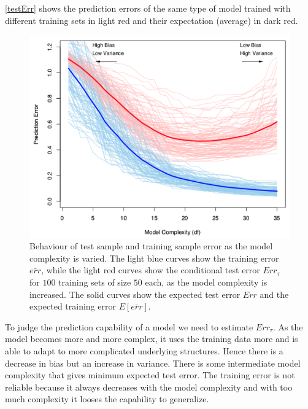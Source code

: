 \documentclass[12pt, letterpaper]{article}
\theoremstyle{definition}
\begin{document}
\autoref{testErr} shows the prediction errors of the same type of model trained with different training sets in light red and their expectation (average) in dark red.

\begin{figure}
\includegraphics[scale=0.6]{img/testErr}
\caption{Behaviour of test sample and training sample error as the model complexity is varied. The light blue curves show the training error $\bar{err}$, while the light red curves show the conditional test error $Err_\tau$ for $100$ training sets of size $50$ each, as the model complexity is increased. The solid curves show the expected test error $Err$ and the expected training error $E[\bar{err}]$.}
\label{testErr}
\end{figure}
To judge the prediction capability of a model we need to estimate $Err_\tau$. As the model becomes more and more complex, it uses the training data more and is able to adapt to more complicated underlying structures. Hence there is a decrease in bias but an increase in variance. There is some intermediate model complexity that gives minimum expected test error. The training error is not reliable because it always decreases with the model complexity and with too much complexity it looses the capability to generalize.
\end{document}
